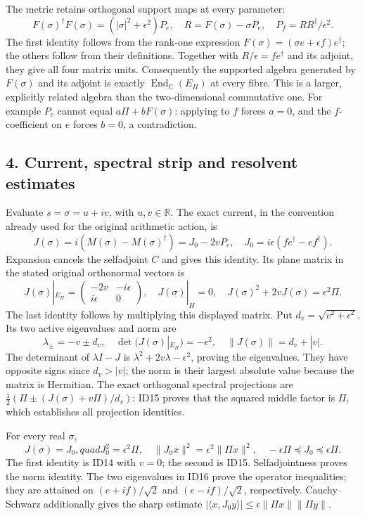 \documentclass[
]{article}
\begin{document}
The metric retains orthogonal support maps at every parameter: \[
F(\sigma)^\dagger F(\sigma)=(|\sigma|^2+\epsilon^2)P_e,
\quad
R=F(\sigma)-\sigma P_e,
\quad P_f=RR^\dagger/\epsilon^2.
\tag{ID13}
\] The first identity follows from the rank-one expression
\(F(\sigma)=(\sigma e+\epsilon f)e^\dagger\); the others follow from
their definitions. Together with \(R/\epsilon=fe^\dagger\) and its
adjoint, they give all four matrix units. Consequently the supported
algebra generated by \(F(\sigma)\) and its adjoint is exactly
\(\operatorname{End}_{\mathbb C}(E_\Pi)\) at every fibre. This is a
larger, explicitly related algebra than the two-dimensional commutative
one. For example \(P_e\) cannot equal \(a\Pi+bF(\sigma)\): applying to
\(f\) forces \(a=0\), and the \(f\)-coefficient on \(e\) forces \(b=0\),
a contradiction.

\subsection{4. Current, spectral strip and resolvent
estimates}\label{current-spectral-strip-and-resolvent-estimates}

Evaluate \(s=\sigma=u+iv\), with \(u,v\in\mathbb R\). The exact current,
in the convention already used for the original arithmetic action, is \[
J(\sigma)=i(M(\sigma)-M(\sigma)^\dagger)
=J_0-2vP_e,
\quad J_0=i\epsilon(fe^\dagger-ef^\dagger).
\tag{ID14}
\] Expansion cancels the selfadjoint \(C\) and gives this identity. Its
plane matrix in the stated original orthonormal vectors is \[
J(\sigma)|_{E_\Pi}=\begin{pmatrix}-2v&-i\epsilon\\i\epsilon&0\end{pmatrix},
\quad J(\sigma)|_H=0,
\quad J(\sigma)^2+2vJ(\sigma)=\epsilon^2\Pi.
\tag{ID15}
\] The last identity follows by multiplying this displayed matrix. Put
\(d_v=\sqrt{v^2+\epsilon^2}\). Its two active eigenvalues and norm are
\[
\lambda_\pm=-v\pm d_v,\quad
\det(J(\sigma)|_{E_\Pi})=-\epsilon^2,
\quad\|J(\sigma)\|=d_v+|v|.
\tag{ID16}
\] The determinant of \(\lambda I-J\) is
\(\lambda^2+2v\lambda-\epsilon^2\), proving the eigenvalues. They have
opposite signs since \(d_v>|v|\); the norm is their largest absolute
value because the matrix is Hermitian. The exact orthogonal spectral
projections are \(\tfrac12(\Pi\pm(J(\sigma)+v\Pi)/d_v)\): ID15 proves
that the squared middle factor is \(\Pi\), which establishes all
projection identities.

For every real \(\sigma\), \[
J(\sigma)=J_0,quad J_0^2=\epsilon^2\Pi,
\quad\|J_0x\|^2=\epsilon^2\|\Pi x\|^2,
\quad-\epsilon\Pi\preceq J_0\preceq\epsilon\Pi.
\tag{ID17}
\] The first identity is ID14 with \(v=0\); the second is ID15.
Selfadjointness proves the norm identity. The two eigenvalues in ID16
prove the operator inequalities; they are attained on \((e+if)/\sqrt2\)
and \((e-if)/\sqrt2\), respectively. Cauchy--Schwarz additionally gives
the sharp estimate
\(|\langle x,J_0y\rangle|\le\epsilon\|\Pi x\|\|\Pi y\|\).
\end{document}
